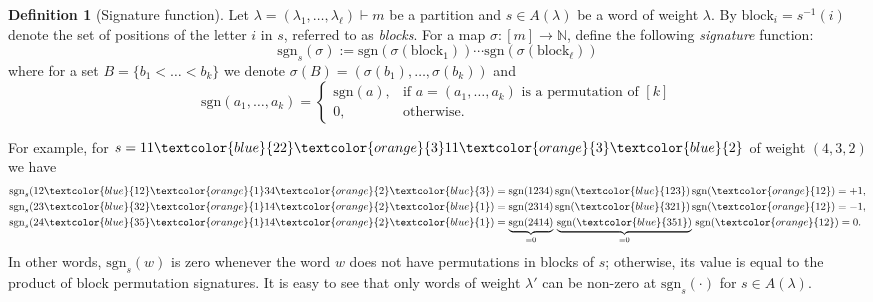 \documentclass[12pt, reqno]{amsart}
\theoremstyle{definition}
\newtheorem{definition}[theorem]{Definition}
\newcommand{\sgn}{\mathrm{sgn}}
\begin{document}
\begin{definition}[Signature function]\label{def:sign}
    Let $\lambda = (\lambda_1,\ldots,\lambda_\ell) \vdash m$ be a partition and $s \in A(\lambda)$ be a word of weight $\lambda$. By $\mathrm{block}_i = s^{-1}(i)$ denote the set of positions of the letter $i$ in $s$, referred to as \textit{blocks}. For a map $\sigma: [m] \to \mathbb{N}$, define the following {\it signature} function:
    \begin{equation}
        \sgn_s(\sigma) := \sgn(\sigma(\mathrm{block}_1))\cdots\sgn(\sigma(\mathrm{block}_\ell))
    \end{equation}
    where for a set $B = \{b_1<\ldots< b_k \}$ we denote $\sigma(B) = (\sigma(b_1),\ldots,\sigma(b_k))$ and
    \begin{equation}
        \sgn(a_1,\ldots, a_k) = 
        \begin{cases}
            \sgn(a),& \text{if } a = (a_1, \ldots, a_k) \text{ is a permutation of $[k]$}\\
            0,              & \text{otherwise}.
        \end{cases}
    \end{equation}
  
    For example, for $s = 11\textcolor{blue}{22}\textcolor{orange}{3}11\textcolor{orange}{3}\textcolor{blue}{2}$ of weight $(4,3,2)$ we have 
    \begin{align*}
        \sgn_s(12\textcolor{blue}{12}\textcolor{orange}{1}34\textcolor{orange}{2}\textcolor{blue}{3}) &= \sgn(1234)\, \sgn(\textcolor{blue}{123})\, \sgn(\textcolor{orange}{12}) = +1,\\
        \sgn_s(23\textcolor{blue}{32}\textcolor{orange}{1}14\textcolor{orange}{2}\textcolor{blue}{1}) &= \sgn(2314)\, \sgn(\textcolor{blue}{321})\, \sgn(\textcolor{orange}{12}) = -1,\\
        \sgn_s(24\textcolor{blue}{35}\textcolor{orange}{1}14\textcolor{orange}{2}\textcolor{blue}{1}) &= \underbrace{\sgn(2414)}_{= 0 }\, \underbrace{\sgn(\textcolor{blue}{351})}_{=0}\, \sgn(\textcolor{orange}{12}) = 0. 
    \end{align*}
    In other words, $\sgn_s(w)$ is zero whenever the word $w$ does not have permutations in blocks of $s$; %
    otherwise, its value is equal to the product of block permutation signatures. It is easy to see that only words of weight $\lambda'$ can be non-zero at $\sgn_s(\cdot)$ for $s \in A(\lambda)$.
\end{definition}
\end{document}

